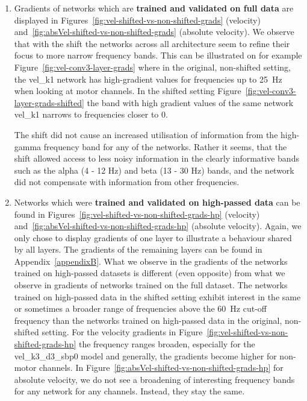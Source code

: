 \begin{enumerate}
    \item Gradients of networks which are \textbf{trained and validated on full data} are displayed in Figures~\ref{fig:vel-shifted-vs-non-shifted-grads} (velocity) and~\ref{fig:absVel-shifted-vs-non-shifted-grads} (absolute velocity).
    We observe that with the shift the networks across all architecture seem to refine their focus to more narrow frequency bands.
    This can be illustrated on for example Figure~\ref{fig:vel-conv3-layer-grads} where in the original, non-shifted setting, the vel\_k1 network has high-gradient values for frequencies up to 25~Hz when looking at motor channels.
    In the shifted setting Figure~\ref{fig:vel-conv3-layer-grads-shifted} the band with high gradient values of the same network vel\_k1 narrows to frequencies closer to 0.
    
    The shift did not cause an increased utilisation of information from the high-gamma frequency band for any of the networks.
    Rather it seems, that the shift allowed access to less noisy information in the clearly informative bands such as the alpha (4 - 12 Hz) and beta (13 - 30 Hz) bands, and the network did not compensate with information from other frequencies.
    
    \item Networks which were \textbf{trained and validated on high-passed data} can be found in Figures~\ref{fig:vel-shifted-vs-non-shifted-grads-hp} (velocity) and~\ref{fig:absVel-shifted-vs-non-shifted-grads-hp} (absolute velocity).
    Again, we only chose to display gradients of one layer to illustrate a behaviour shared by all layers.
    The gradients of the remaining layers can be found in Appendix~\ref{appendixB}.
    What we observe in the gradients of the networks trained on high-passed datasets is different (even opposite) from what we observe in gradients of networks trained on the full dataset.
    The networks trained on high-passed data in the shifted setting exhibit interest in the same or sometimes a broader range of frequencies above the 60~Hz cut-off frequency than the networks trained on high-passed data in the original, non-shifted setting. 
    For the velocity gradients in Figure~\ref{fig:vel-shifted-vs-non-shifted-grads-hp} the frequency ranges broaden, especially for the vel\_k3\_d3\_sbp0 model and generally, the gradients become higher for non-motor channels.
    In Figure~\ref{fig:absVel-shifted-vs-non-shifted-grads-hp} for absolute velocity, we do not see a broadening of interesting frequency bands for any network for any channels. Instead, they stay the same.
    

\end{enumerate}
